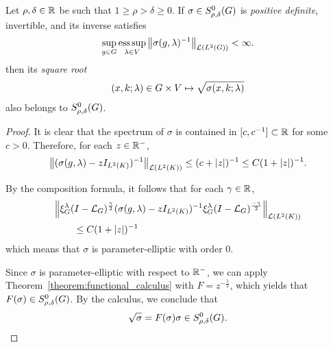 \begin{lemma}
\label{lemma:square_root_of_a_symbol_of_order_zero}
    Let $\rho, \delta \in \R$ be such that $1 \geq \rho > \delta \geq 0$.
    If $\sigma \in \SymbolClass 0 {\rho, \delta}$ is \emph{positive definite},
    invertible,
    and its inverse satisfies
    \begin{align*}
        \sup_{g \in \Group} \esssup_{\lambda \in \VectorSpace} \norm [\Lin {\Lebesgue 2 \Group}] {\sigma(g, \lambda)^{-1}} < \infty.
    \end{align*}
    then its \emph{square root}
    \begin{align*}
        (x, k; \lambda) \in \Group \times \VectorSpace \mapsto \sqrt{\sigma(x, k; \lambda)}
    \end{align*}
    also belongs to $\SymbolClass 0 {\rho, \delta}$.
\end{lemma}
\begin{proof}
    It is clear that the spectrum of $\sigma$ is contained in $[c, c^{-1}] \subset \R$ for some $c > 0$.
    Therefore, for each $z \in \R^{-}$,
    \begin{align*}
        \norm [\Lin {\Lebesgue 2 \CompactGroup}] {(\sigma(g, \lambda) - z \Id {\Lebesgue 2 \CompactGroup})^{-1}}
        \leq (c + \abs z)^{-1}
        \leq C(1 + \abs z)^{-1}.
    \end{align*}

    By the composition formula,
    it follows that for each $\gamma \in \R$,
    \begin{align*}
        &\norm [\Lin {\Lebesgue 2 \CompactGroup}] {
            \Rep \lambda \BesselPotential \gamma
            (\sigma(g, \lambda) - z \Id {\Lebesgue 2 \CompactGroup})^{-1}
            \Rep \lambda \BesselPotential {-\gamma}
        }\\
        &\qquad \leq C(1 + \abs z)^{-1}
    \end{align*}
    which means that $\sigma$ is parameter-elliptic with order $0$.

    Since $\sigma$ is parameter-elliptic with respect to $\R^-$,
    we can apply Theorem~\ref{theorem:functional_calculus} with $F = z^{-\frac 1 2}$,
    which yields that $F(\sigma) \in \SymbolClass {0} {\rho, \delta}$.
    By the calculus,
    we conclude that
    \begin{align*}
        \sqrt \sigma = F(\sigma) \sigma \in \SymbolClass 0 {\rho, \delta}.
    \end{align*}
\end{proof}

